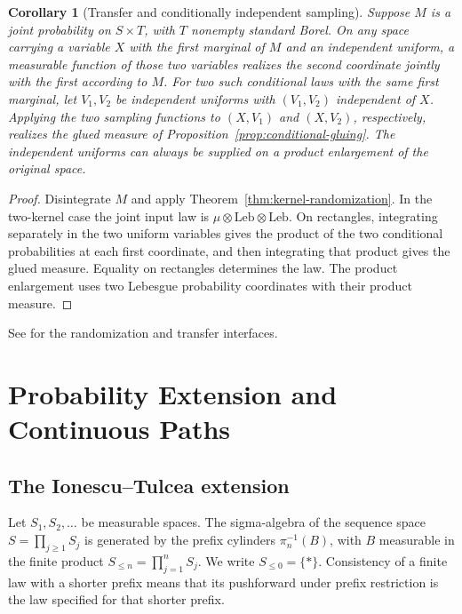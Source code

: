 \documentclass[11pt,oneside,openany]{book}
\theoremstyle{plain}
\newtheorem{corollary}[theorem]{Corollary}
\theoremstyle{definition}
\theoremstyle{remark}
\begin{document}
\begin{corollary}[Transfer and conditionally independent sampling]
\label{cor:conditional-sampling}
Suppose \(M\) is a joint probability on \(S\times T\), with \(T\) nonempty standard Borel. On any space carrying a variable \(X\) with the first marginal of \(M\) and an independent uniform, a measurable function of those two variables realizes the second coordinate jointly with the first according to \(M\). For two such conditional laws with the same first marginal, let \(V_1,V_2\) be independent uniforms with \((V_1,V_2)\) independent of \(X\). Applying the two sampling functions to \((X,V_1)\) and \((X,V_2)\), respectively, realizes the glued measure of Proposition~\ref{prop:conditional-gluing}. The independent uniforms can always be supplied on a product enlargement of the original space.
\end{corollary}
\begin{proof}
Disintegrate \(M\) and apply Theorem~\ref{thm:kernel-randomization}. In the two-kernel case the joint input law is \(\mu\otimes\mathrm{Leb}\otimes\mathrm{Leb}\). On rectangles, integrating separately in the two uniform variables gives the product of the two conditional probabilities at each first coordinate, and then integrating that product gives the glued measure. Equality on rectangles determines the law. The product enlargement uses two Lebesgue probability coordinates with their product measure.
\end{proof}

See \cite[Lemma 4.22, p.~94, and results 8.17--8.20, pp.~175--177]{Kallenberg} for the randomization and transfer interfaces.
\chapter{Probability Extension and Continuous Paths}

\section{The Ionescu--Tulcea extension}\label{p05-01}

Let \(S_1,S_2,\ldots\) be measurable spaces. The sigma-algebra of the sequence space \(S=\prod_{j\ge1} S_j\) is generated by the prefix cylinders \(\pi_n^{-1}(B)\), with \(B\) measurable in the finite product \(S_{\le n}=\prod_{j=1}^n S_j\). We write \(S_{\le0}=\{*\}\). Consistency of a finite law with a shorter prefix means that its pushforward under prefix restriction is the law specified for that shorter prefix.
\end{document}
